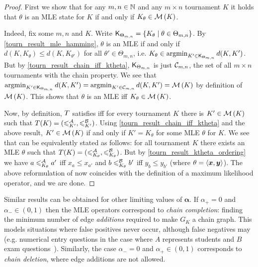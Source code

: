 \begin{proof}
    First we show that for any $m, n \in \mathbb{N}$ and any $m \times n$ tournament
    $K$ it holds that $\theta$ is an MLE state for $K$ if and only if $K_\theta
    \in \operatorname{\mathcal{M}}\left({K}\right)$.

    Indeed, fix some $m, n$ and $K$. Write $\mathsf{K}_{\Theta_{m,n}} = \{K_\theta \mid
    \theta \in \Theta_{m,n}\}$. By \cref{tourn_result_mle_hamming}, $\theta$ is an MLE
    if and only if $d(K, K_\theta) \le d(K, K_{\theta'})$ for all $\theta' \in
    \Theta_{m,n}$, i.e. $K_\theta \in \operatorname{argmin}_{K' \in \mathsf{K}_{\Theta_{m,n}}}{d(K,
    K')}$. But by \cref{tourn_result_chain_iff_ktheta}, $\mathsf{K}_{\Theta_{m,n}}$ is just
    $\mathcal{C}_{m,n}$, the set of all $m \times n$ tournaments with the chain
    property. We see that $\operatorname{argmin}_{K' \in \mathsf{K}_{\Theta_{m,n}}}{d(K, K')} =
    \operatorname{argmin}_{K' \in \mathcal{C}_{m,n}}{d(K, K')} = \operatorname{\mathcal{M}}\left({K}\right)$ by definition of
    $\operatorname{\mathcal{M}}\left({K}\right)$. This shows that $\theta$ is an MLE iff $K_\theta \in
    \operatorname{\mathcal{M}}\left({K}\right)$.

    Now, by definition, $T$ satisfies \chainmin{} iff for every
    tournament $K$ there is $K' \in \operatorname{\mathcal{M}}\left({K}\right)$ such that $T(K) =
    ({\leqslant^{\mathcal{A}}_{K'}}, {\leqslant^{\mathcal{B}}_{K'}})$. Using \cref{tourn_result_chain_iff_ktheta} and the
    above result, $K' \in \operatorname{\mathcal{M}}\left({K}\right)$ if and only if $K' = K_\theta$ for some
    MLE $\theta$ for $K$. We see that \chainmin{} can be equivalently
    stated as follows: for all tournament $K$ there exists an MLE $\theta$ such
    that $T(K) = ({\leqslant^{\mathcal{A}}_{K_\theta}}, {\leqslant^{\mathcal{B}}_{K_\theta}})$. But by
    \cref{tourn_result_ktheta_ordering} we have $a \leqslant^{\mathcal{A}}_{K_\theta} a'$ iff $x_a \le
    x_{a'}$ and $b \leqslant^{\mathcal{B}}_{K_\theta} b'$ iff $y_b \le y_{b'}$ (where $\theta =
    \langle {\bm{x}, \bm{y}} \rangle$). The above reformulation of \chainmin{}
    now coincides with the definition of a maximum likelihood operator, and we
    are done.
\end{proof}

Similar results can be obtained for
other limiting values of $\bm{\alpha}$. If $\alpha_+ = 0$ and $\alpha_- \in (0,
1)$ then the MLE operators correspond to \emph{chain completion}: finding
the minimum number of edge \emph{additions} required to make $G_K$ a chain graph. This
models situations where false positives never occur, although false negatives
may (e.g. numerical entry questions in the case where $A$ represents students
and $B$ exam questions~\cite{jiao2017algorithms}). Similarly, the case
$\alpha_- = 0$ and $\alpha_+ \in (0, 1)$ corresponds to \emph{chain deletion},
where edge additions are not allowed.


